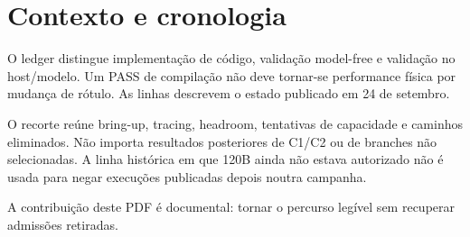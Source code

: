 \section{Contexto e cronologia}
O ledger distingue implementação de código, validação model-free e validação no host/modelo. Um PASS de compilação não deve tornar-se performance física por mudança de rótulo. As linhas descrevem o estado publicado em 24 de setembro. 

O recorte reúne bring-up, tracing, headroom, tentativas de capacidade e caminhos eliminados. Não importa resultados posteriores de C1/C2 ou de branches não selecionadas. A linha histórica em que 120B ainda não estava autorizado não é usada para negar execuções publicadas depois noutra campanha. 

A contribuição deste PDF é documental: tornar o percurso legível sem recuperar admissões retiradas.
